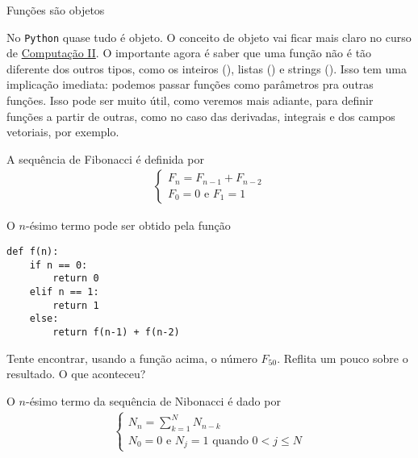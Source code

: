 	
	
	\begin{interlude}{Funções são objetos}
	
	No \texttt{Python} quase tudo é objeto. O conceito de objeto vai ficar mais claro no curso de \href{https://github.com/pedromxavier/monitoria/raw/master/tex/comp2.pdf}{Computação II}. O importante agora é saber que uma função não é tão diferente dos outros tipos, como os inteiros (), listas () e strings (). Isso tem uma implicação imediata: podemos passar funções como parâmetros pra outras funções. Isso pode ser muito útil, como veremos mais adiante, para definir funções a partir de outras, como no caso das derivadas, integrais e dos campos vetoriais, por exemplo.
	
	\end{interlude}	
	
	
	A sequência de Fibonacci é definida por
	\begin{align*}
		\begin{cases}
		F_{n} = F_{n-1} + F_{n-2}\\
		F_{0} = 0 \text{ e } F_{1} = 1
		\end{cases}
	\end{align*}
	
	O $n$-ésimo termo pode ser obtido pela função

	\begin{lstlisting}[caption="Fibonacci"]
def f(n):
	if n == 0:
		return 0
	elif n == 1:
		return 1
	else:
		return f(n-1) + f(n-2)
	\end{lstlisting}
	
	\quest Tente encontrar, usando a função acima, o número $F_{50}$. Reflita um pouco sobre o resultado. O que aconteceu?
	
	
	O $n$-ésimo termo da sequência de Nibonacci é dado por
	\begin{align*}
		\begin{cases}
		\displaystyle N_{n} = \sum_{k=1}^{N} N_{n-k}\\
		N_{0} = 0 \text{ e } N_{j} = 1 \text{ quando } 0 < j \leq N
		\end{cases}
	\end{align*}
	
